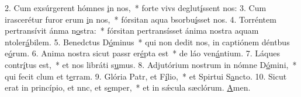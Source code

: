 2. Cum exsúrgerent hómnes \uline{i}n nos,~* forte vivs deglut\uline{í}ssent nos:
3. Cum irascerétur furor erum \uline{i}n nos,~* fórsitan aqua bsorbu\uline{í}sset nos.
4. Torréntem pertransívit ánma n\uline{o}stra:~* fórsitan pertransísset ánima nostra aquam ntoler\uline{á}bilem.
5. Benedctus D\uline{ó}minus~* qui non dedit nos, in captiónem déntbus e\uline{ó}rum.
6. Anima nostra sicut passr er\uline{é}pta est~* de láo ven\uline{á}ntium.
7. Láques contr\uline{í}tus est,~* et nos libráti s\uline{u}mus.
8. Adjutórium nostrum in nómne D\uline{ó}mini,~* qui fecit clum et t\uline{e}rram.
9. Glória Patr, et F\uline{í}lio,~* et Spirtui S\uline{a}ncto.
10. Sicut erat in princípio, et nnc, et s\uline{e}mper,~* et in sǽcula sæclórum. \uline{A}men.
